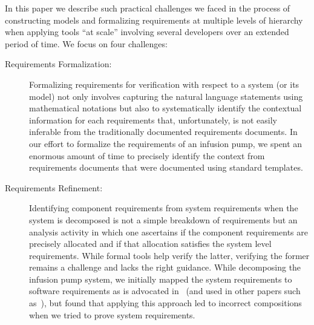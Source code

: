 In this paper we describe such practical challenges we faced in the process of constructing models and formalizing requirements at multiple levels of hierarchy when applying tools ``at scale'' involving several developers over an extended period of time.  We focus on four challenges:
\begin{description}
        \item[Requirements Formalization:] Formalizing requirements for verification with respect to a system (or its model) not only involves capturing the natural language statements using mathematical notations but also to systematically identify the contextual information for each requirements that, unfortunately, is not easily inferable from the traditionally documented requirements documents. In our effort to formalize the requirements of an infusion pump, we spent an enormous amount of time to precisely identify the context from requirements documents that were documented using standard templates. %
    \item[Requirements Refinement:] Identifying component requirements from system requirements when the system is decomposed is not a simple breakdown of requirements but an analysis activity in which one ascertains if the component requirements are precisely allocated and if that allocation satisfies the system level requirements. While formal tools help verify the latter, verifying the former remains a challenge and lacks the right guidance. While decomposing the infusion pump system, we initially mapped the system requirements to software requirements as is advocated in~\cite{Miller01:dasc} (and used in other papers such as~\cite{Jeffords:2010:MCV:1938390.1938407,Kauppinen07:re}), but found that applying this approach led to incorrect compositions when we tried to prove system requirements.

\end{description}
